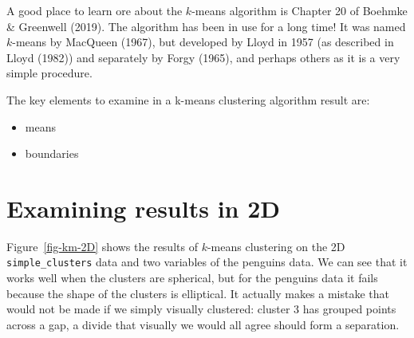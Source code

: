 \documentclass[
  letterpaper,
]{book}
\providecommand{\tightlist}{%
  \setlength{\itemsep}{0pt}\setlength{\parskip}{0pt}}\usepackage{longtable,booktabs,array}
\begin{document}
A good place to learn ore about the \(k\)-means algorithm is Chapter 20
of Boehmke \& Greenwell (2019). The algorithm has been in use for a long
time! It was named \(k\)-means by MacQueen (1967), but developed by
Lloyd in 1957 (as described in Lloyd (1982)) and separately by Forgy
(1965), and perhaps others as it is a very simple procedure.

The key elements to examine in a k-means clustering algorithm result
are:

\begin{itemize}
\tightlist
\item
  means
\item
  boundaries
\end{itemize}

\hypertarget{examining-results-in-2d}{%
\section{Examining results in 2D}\label{examining-results-in-2d}}

Figure~\ref{fig-km-2D} shows the results of \(k\)-means clustering on
the 2D \texttt{simple\_clusters} data and two variables of the penguins
data. We can see that it works well when the clusters are spherical, but
for the penguins data it fails because the shape of the clusters is
elliptical. It actually makes a mistake that would not be made if we
simply visually clustered: cluster 3 has grouped points across a gap, a
divide that visually we would all agree should form a separation.
\end{document}
